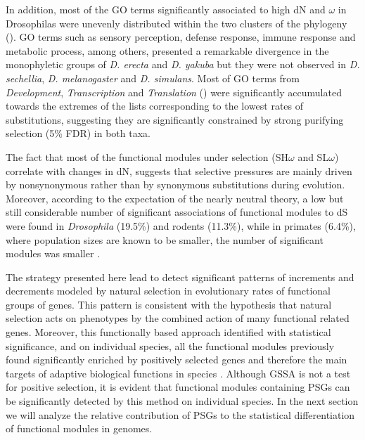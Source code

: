 In addition, most of the GO terms significantly associated to high dN and $\omega$ in Drosophilas were unevenly distributed within the two clusters of the phylogeny (). GO terms such as sensory perception, defense response, immune response and metabolic process, among others, presented a remarkable divergence in the monophyletic groups of \textit{D. erecta} and \textit{D. yakuba} but they were not observed in \textit{D. sechellia}, \textit{D. melanogaster} and \textit{D. simulans}. Most of GO terms from \textit{Development}, \textit{Transcription} and \textit{Translation} () were significantly accumulated towards the extremes of the lists corresponding to the lowest rates of substitutions, suggesting they are significantly constrained by strong purifying selection (5\% FDR) in both taxa.

The fact that most of the functional modules under selection (SH$\omega$ and SL$\omega$) correlate with changes in dN, suggests that selective pressures are mainly driven by nonsynonymous rather than by synonymous substitutions during evolution. Moreover, according to the expectation of the nearly neutral theory, a low but still considerable number of significant associations of functional modules to dS were found in \textit{Drosophila} (19.5\%) and rodents (11.3\%), while in primates (6.4\%), where population sizes are known to be smaller, the number of significant modules was smaller \cite{Petit2009}.

The strategy presented here lead to detect significant patterns of increments and decrements modeled by natural selection in evolutionary rates of functional groups of genes. This pattern is consistent with the hypothesis that natural selection acts on phenotypes by the combined action of many functional related genes. Moreover, this functionally based approach identified with statistical significance, and on individual species, all the functional modules previously found significantly enriched by positively selected genes and therefore the main targets of adaptive biological functions in species . Although GSSA is not a test for positive selection, it is evident that functional modules containing PSGs can be significantly detected by this method on individual species. In the next section we will analyze the relative contribution of PSGs to the statistical differentiation of functional modules in genomes.



